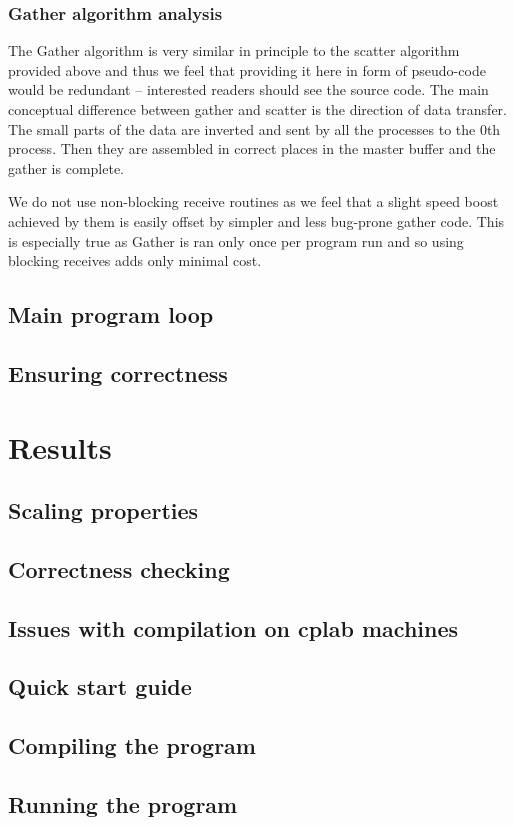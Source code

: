 \documentclass[11pt,a4paper]{article}
\begin{document}
\subsubsection{Gather algorithm analysis}
The Gather algorithm is very similar in principle to the scatter algorithm provided above and thus we feel that providing it here in form of pseudo-code would be redundant -- interested readers should see the source code. The main conceptual difference between gather and scatter is the direction of data transfer. The small parts of the data are inverted and sent by all the processes to the 0th process. Then they are assembled in correct places in the master buffer and the gather is complete.

We do not use non-blocking receive routines as we feel that a slight speed boost achieved by them is easily offset by simpler and less bug-prone gather code. This is especially true as Gather is ran only once per program run and so using blocking receives adds only minimal cost.
\subsection{Main program loop}
\subsection{Ensuring correctness}

\section{Results}
\subsection{Scaling properties}
\subsection{Correctness checking}
\subsection{Issues with compilation on cplab machines}


\newpage
\begin{appendices}
\section{Quick start guide}
\subsection{Compiling the program}
\subsection{Running the program}

\end{appendices}
\end{document}
